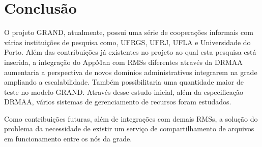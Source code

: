 \section{Conclusão}
\label{cap:conclusao}

O projeto GRAND, atualmente, possui uma série de cooperações informais com várias instituições de pesquisa como, UFRGS, UFRJ, UFLA e Universidade do Porto. Além das contribuições já existentes no projeto ao qual esta pesquisa está inserida, a integração do AppMan com RMSs diferentes através da DRMAA aumentaria a perspectiva de novos domínios administrativos integrarem na grade ampliando a escalabilidade. Também possibilitaria uma quantidade maior de teste no modelo GRAND. Através desse estudo inicial, além da especificação DRMAA, vários sistemas de gerenciamento de recursos foram estudados.

Como contribuições futuras, além de integrações com demais RMSs, a solução do problema da necessidade de existir um serviço de compartilhamento de arquivos em funcionamento entre os nós da grade.
